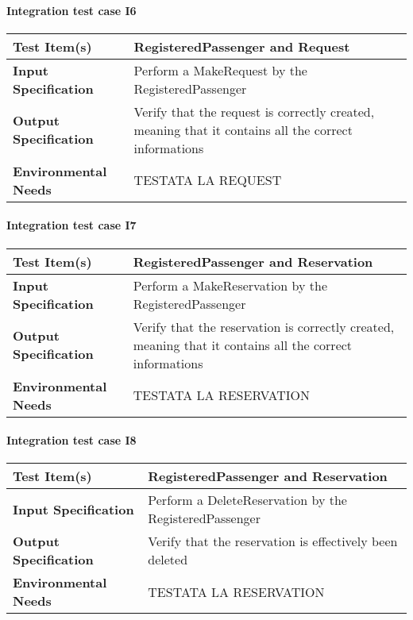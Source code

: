 \paragraph{Integration test case I6}
\begin{tabular}{l | l}
	\hline
	\textbf{Test Item(s)} & RegisteredPassenger and Request \\
	\hline
	\textbf{Input Specification} & Perform a MakeRequest by the RegisteredPassenger \\
	\hline
	\textbf{Output Specification} & Verify that the request is correctly created, meaning that it contains all the correct informations \\
	\hline
	\textbf{Environmental Needs} & TESTATA LA REQUEST \\
\end{tabular}

\paragraph{Integration test case I7}
\begin{tabular}{l | l}
	\hline
	\textbf{Test Item(s)} & RegisteredPassenger and Reservation \\
	\hline
	\textbf{Input Specification} & Perform a MakeReservation by the RegisteredPassenger \\
	\hline
	\textbf{Output Specification} & Verify that the reservation is correctly created, meaning that it contains all the correct informations \\
	\hline
	\textbf{Environmental Needs} &  TESTATA LA RESERVATION \\
\end{tabular}

\paragraph{Integration test case I8}
\begin{tabular}{l | l}
	\hline
	\textbf{Test Item(s)} & RegisteredPassenger and Reservation \\
	\hline
	\textbf{Input Specification} & Perform a DeleteReservation by the RegisteredPassenger \\
	\hline
	\textbf{Output Specification} & Verify that the reservation is effectively been deleted \\
	\hline
	\textbf{Environmental Needs} &  TESTATA LA RESERVATION \\
\end{tabular}

